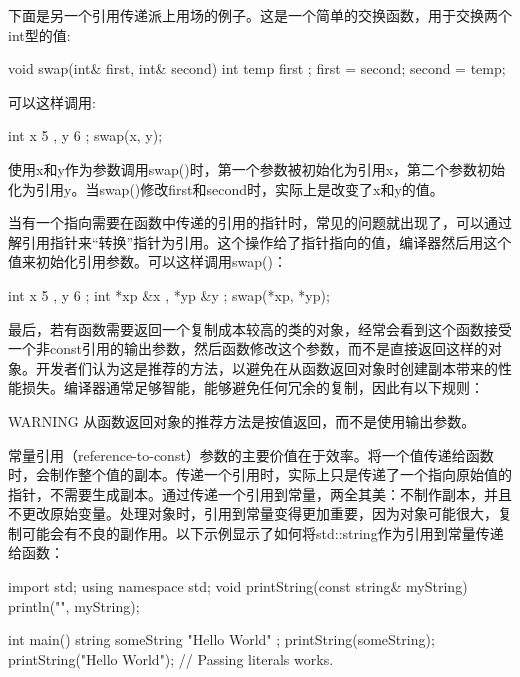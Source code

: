 下面是另一个引用传递派上用场的例子。这是一个简单的交换函数，用于交换两个int型的值:

\begin{cpp}
void swap(int& first, int& second)
{
    int temp { first };
    first = second;
    second = temp;
}
\end{cpp}

可以这样调用:

\begin{cpp}
int x { 5 }, y { 6 };
swap(x, y);
\end{cpp}

使用x和y作为参数调用swap()时，第一个参数被初始化为引用x，第二个参数初始化为引用y。当swap()修改first和second时，实际上是改变了x和y的值。

当有一个指向需要在函数中传递的引用的指针时，常见的问题就出现了，可以通过解引用指针来“转换”指针为引用。这个操作给了指针指向的值，编译器然后用这个值来初始化引用参数。可以这样调用swap()：

\begin{cpp}
int x { 5 }, y { 6 };
int *xp { &x }, *yp { &y };
swap(*xp, *yp);
\end{cpp}

最后，若有函数需要返回一个复制成本较高的类的对象，经常会看到这个函数接受一个非const引用的输出参数，然后函数修改这个参数，而不是直接返回这样的对象。开发者们认为这是推荐的方法，以避免在从函数返回对象时创建副本带来的性能损失。编译器通常足够智能，能够避免任何冗余的复制，因此有以下规则：

\begin{myWarning}{WARNING}
从函数返回对象的推荐方法是按值返回，而不是使用输出参数。
\end{myWarning}


常量引用（reference-to-const）参数的主要价值在于效率。将一个值传递给函数时，会制作整个值的副本。传递一个引用时，实际上只是传递了一个指向原始值的指针，不需要生成副本。通过传递一个引用到常量，两全其美：不制作副本，并且不更改原始变量。处理对象时，引用到常量变得更加重要，因为对象可能很大，复制可能会有不良的副作用。以下示例显示了如何将std::string作为引用到常量传递给函数：

\begin{cpp}
import std;
using namespace std;
void printString(const string& myString) { println("{}", myString); }

int main()
{
    string someString { "Hello World" };
    printString(someString);
    printString("Hello World"); // Passing literals works.
}
\end{cpp}


